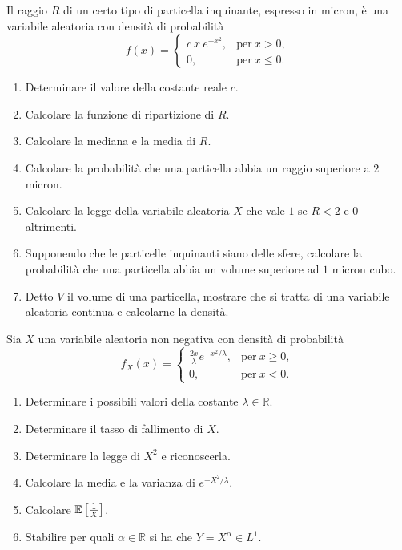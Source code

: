 Il raggio $R$ di un certo tipo di particella inquinante, espresso in micron, è una variabile aleatoria con densità di probabilità
\begin{equation*}
f(x) =\begin{cases}
c\ x\ e^{-x^{2}} , & \text{per} \ x >0,\\
0, & \text{per} \ x\leq 0.
\end{cases}
\end{equation*}
\begin{enumerate}
\item Determinare il valore della costante reale $c$.
\item Calcolare la funzione di ripartizione di $R$.
\item Calcolare la mediana e la media di $R$.
\item Calcolare la probabilità che una particella abbia un raggio superiore a $2$ micron.
\item Calcolare la legge della variabile aleatoria $X$ che vale $1$ se $R< 2$ e $0$ altrimenti.
\item Supponendo che le particelle inquinanti siano delle sfere, calcolare la probabilità che una particella abbia un volume superiore ad $1$ micron cubo.
\item Detto $V$ il volume di una particella, mostrare che si tratta di una variabile aleatoria continua e calcolarne la densità.
\end{enumerate}
\Esercizio{}

Sia $X$ una variabile aleatoria non negativa con densità di probabilità
\begin{equation*}
f_{X}(x) =\begin{cases}
\frac{2x}{\lambda } e^{-x^{2} /\lambda } , & \text{per} \ x\geq 0,\\
0, & \text{per} \ x< 0.
\end{cases}
\end{equation*}
\begin{enumerate}
\item Determinare i possibili valori della costante $\lambda \in \mathbb{R}$.
\item Determinare il tasso di fallimento di $X$.
\item Determinare la legge di $X^{2}$ e riconoscerla.
\item Calcolare la media e la varianza di $e^{-X^{2} /\lambda }$.
\item Calcolare $\mathbb{E}\left[\frac{1}{X}\right]$.
\item Stabilire per quali $\alpha \in \mathbb{R}$ si ha che $Y=X^{\alpha } \in L^{1}$.
\end{enumerate}
\Esercizio{}

